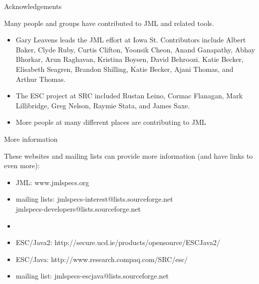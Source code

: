 \documentclass[
pdf,
nocolorBG,
slideColor,
erik,
]{prosper}
\begin{document}
\begin{slide}{Acknowledgements}

\vspace*{-4ex}
Many people and groups have contributed to JML and related tools.

\begin{itemize}
\item {\scriptsize Gary Leavens leads the JML effort at Iowa St. 
    Contributors include Albert Baker, Clyde Ruby, Curtis
    Clifton, Yoonsik Cheon, Anand Ganapathy, Abhay Bhorkar, Arun
    Raghavan, Kristina Boysen, David Behroozi. Katie Becker, Elisabeth
    Seagren, Brandon Shilling, Katie Becker, Ajani Thomas, and Arthur
    Thomas.}
\item {\scriptsize The ESC project at SRC included Rustan 
    Leino, Cormac Flanagan, Mark Lillibridge, Greg Nelson, Raymie
    Stata, and James Saxe.}
\item {\scriptsize More people at many different places are contributing to JML}
\end{itemize}
  
\end{slide}

\begin{slide}{More information}

\vspace*{-4ex}
These websites and mailing lists can provide more information (and have links to even more):

\begin{itemize}

\item JML: www.jmlspecs.org
\item mailing lists:  jmlspecs-interest@lists.sourceforge.net\\
jmlspecs-developers@lists.sourceforge.net 

\item[]
\item ESC/Java2:  http://secure.ucd.ie/products/opensource/ESCJava2/
\item ESC/Java:    http://www.research.compaq.com/SRC/esc/
\item mailing list:  jmlspecs-escjava@lists.sourceforge.net

\end{itemize}
  
\end{slide}
\end{document}
